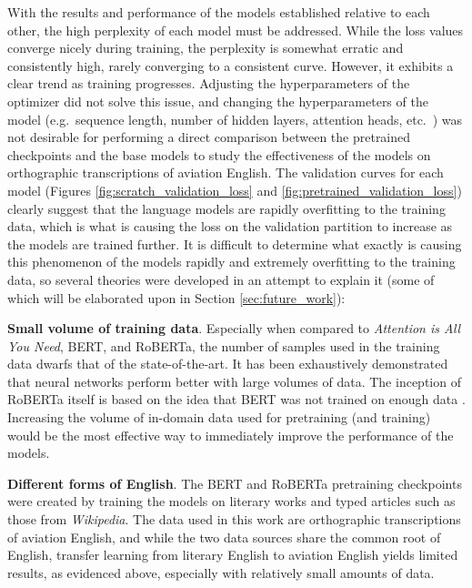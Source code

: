 \documentclass[12pt]{article}
\begin{document}
With the results and performance of the models established relative to each other, the high perplexity of each model must be addressed. While the loss
values converge nicely during training, the perplexity is somewhat erratic and consistently high, rarely converging to a consistent curve. However, it
exhibits a clear trend as training progresses. Adjusting the hyperparameters of the optimizer did not solve this issue, and changing the
hyperparameters of the model (e.g.~sequence length, number of hidden layers, attention heads, etc.~) was not desirable for performing a direct
comparison between the pretrained checkpoints and the base models to study the effectiveness of the models on orthographic transcriptions of aviation
English. The validation curves for each model (Figures \ref{fig:scratch_validation_loss} and \ref{fig:pretrained_validation_loss}) clearly suggest
that the language models are rapidly overfitting to the training data, which is what is causing the loss on the validation partition to increase as
the models are trained further. It is difficult to determine what exactly is causing this phenomenon of the models rapidly and extremely overfitting
to the training data, so several theories were developed in an attempt to explain it (some of which will be elaborated upon in Section
\ref{sec:future_work}):

\textbf{Small volume of training data}. Especially when compared to \textit{Attention is All You Need}, BERT, and RoBERTa,
\cite{vaswani_attention_2017,devlin_bert_2019,liu_roberta_2019} the number of samples used in the training data dwarfs that of the state-of-the-art.
It has been exhaustively demonstrated that neural networks perform better with large volumes of data. The inception of RoBERTa itself is based on the
idea that BERT was not trained on enough data \cite{liu_roberta_2019}. Increasing the volume of in-domain data used for pretraining (and training)
would be the most effective way to immediately improve the performance of the models.

\textbf{Different forms of English}. The BERT and RoBERTa pretraining checkpoints were created by training the models on literary works and typed
articles such as those from \textit{Wikipedia}. The data used in this work are orthographic transcriptions of aviation English, and while the two data
sources share the common root of English, transfer learning from literary English to aviation English yields limited results, as evidenced above,
especially with relatively small amounts of data.
\end{document}
